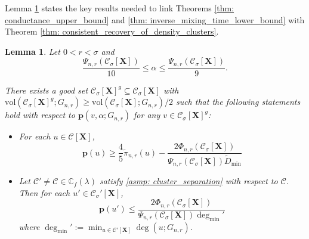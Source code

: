 \documentclass{article}
\newcommand{\vol}{\mathrm{vol}}
\newcommand{\1}{\mathbf{1}}
\newcommand{\degminpr}{\deg_{\min}'}
\newcommand{\pbf}{\mathbf{p}}
\newcommand{\Xbf}{\mathbf{X}}
\newcommand{\Cbb}{\mathbb{C}}
\newcommand{\Cset}{\mathcal{C}}
\newcommand{\Csig}{\Cset_{\sigma}}
\theoremstyle{aldenthm}
\newtheorem{lemma}{Lemma}
\begin{document}
Lemma \ref{lem: setup} states the key results needed to link Theorems \ref{thm: conductance_upper_bound} and \ref{thm: inverse_mixing_time_lower_bound} with Theorem \ref{thm: consistent_recovery_of_density_clusters}.  
\begin{lemma} 
	\label{lem: setup}
	Let $0 < r < \sigma$ and
	\begin{equation} 
	\label{eqn: upper_bound_alpha}
	\frac{\Psi_{n,r}(\Csig[\Xbf])}{10} \leq \alpha \leq \frac{\Psi_{n,r}(\Csig[\Xbf])}{9}.
	\end{equation}
	
	There exists a good set $\Csig[\Xbf]^g \subseteq \Csig[\Xbf]$ with $\vol(\Csig[\Xbf]^g; G_{n,r}) \geq \vol(\Csig[\Xbf]; G_{n,r})/2$ such that the following statements hold with respect to $\pbf(v,\alpha;G_{n,r})$ for any $v \in \Csig[\Xbf]^g$:
	\begin{itemize}
		\item For each $u \in \Cset[\Xbf]$,
		\begin{equation}
		\label{eqn: lower_bound_PPR_in_cluster}
		\pbf(u) \geq \frac{4}{5} \widetilde{\pi}_{n,r}(u) - \frac{2 \Phi_{n,r}(\Csig[\Xbf])}{\Psi_{n,r}(\Csig[\Xbf]) \widetilde{D}_{\min}}
		\end{equation}
		\item Let $\Cset' \neq \Cset \in \Cbb_f(\lambda)$ satisfy \ref{asmp: cluster_separation} with respect to $\Cset$. Then for each $u' \in \Csig'[\Xbf]$,
		\begin{equation}
		\label{eqn: upper_bound_PPR_in_other_cluster}
		\pbf(u') \leq \frac{2 \Phi_{n,r}(\Csig[\Xbf])}{\Psi_{n,r}(\Csig[\Xbf]) \degminpr}
		\end{equation}
		where $ \deg_{\min}' := \min_{u \in \Cset'[\Xbf]} \deg(u; G_{n,r})$. 
	\end{itemize}
\end{lemma}
\end{document}
